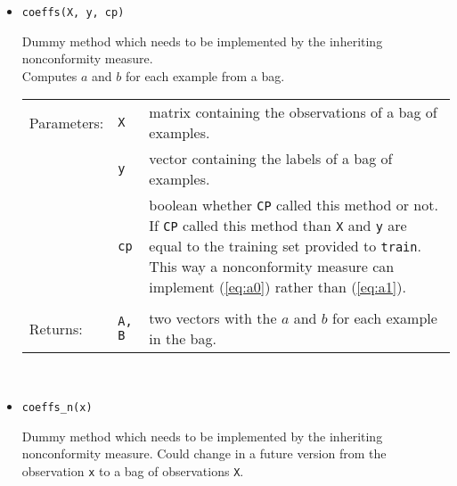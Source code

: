 \documentclass[twoside,11pt]{article}
\def\wo{~\\}
\begin{document}
\begin{appendices}
\begin{itemize}
\begin{itemize}
\begin{itemize}
                \item
                  \texttt{coeffs(X, y, cp)}

                  Dummy method which needs to be
                  implemented by the inheriting
                  nonconformity measure.
                  \\

                  Computes $a$ and $b$ for each example
                  from a bag.
                  \\

                  \begin{tabu}{llX}
                    Parameters: &\texttt{X}
                                &matrix containing the
                                 observations of a bag of
                                 examples.
                                 \\
                                &\texttt{y}
                                &vector containing the
                                 labels of a bag of
                                 examples.
                                 \\
                                &\texttt{cp}
                                &boolean whether
                                 \texttt{CP} called this
                                 method or not.
                                 If \texttt{CP} called this
                                 method than \texttt{X} and
                                 \texttt{y} are equal to
                                 the training set provided
                                 to \texttt{train}.
                                 This way a nonconformity
                                 measure can implement
                                 (\ref{eq:a0}) rather than
                                 (\ref{eq:a1}).
                                 \\\\
                      Returns:  &\texttt{A, B}
                                &two vectors with the $a$
                                 and $b$ for each example
                                 in the bag.
                                 \\
                    \end{tabu}
                    \wo

                \item
                  \texttt{coeffs\_n(x)}

                  Dummy method which needs to be
                  implemented by the inheriting
                  nonconformity measure.
                  Could change in a future version from the
                  observation \texttt{x} to a bag of
                  observations \texttt{X}.
                  \\


\end{itemize}
\end{itemize}
\end{itemize}
\end{appendices}
\end{document}
